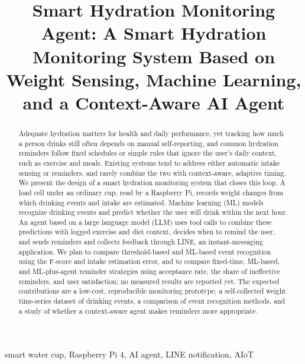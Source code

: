 \documentclass[conference]{IEEEtran}
\begin{document}
\title{Smart Hydration Monitoring Agent: A Smart Hydration Monitoring System Based on Weight Sensing, Machine Learning, and a Context-Aware AI Agent}

\author{
\and
{}
\and
{}
}

\maketitle

\begin{abstract}
Adequate hydration matters for health and daily performance, yet tracking how much a person drinks still often depends on manual self-reporting, and common hydration reminders follow fixed schedules or simple rules that ignore the user's daily context, such as exercise and meals. Existing systems tend to address either automatic intake sensing or reminders, and rarely combine the two with context-aware, adaptive timing. We present the design of a smart hydration monitoring system that closes this loop. A load cell under an ordinary cup, read by a Raspberry Pi, records weight changes from which drinking events and intake are estimated. Machine learning (ML) models recognize drinking events and predict whether the user will drink within the next hour. An agent based on a large language model (LLM) uses tool calls to combine these predictions with logged exercise and diet context, decides when to remind the user, and sends reminders and collects feedback through LINE, an instant-messaging application. We plan to compare threshold-based and ML-based event recognition using the F-score and intake estimation error, and to compare fixed-time, ML-based, and ML-plus-agent reminder strategies using acceptance rate, the share of ineffective reminders, and user satisfaction; no measured results are reported yet. The expected contributions are a low-cost, reproducible monitoring prototype, a self-collected weight time-series dataset of drinking events, a comparison of event recognition methods, and a study of whether a context-aware agent makes reminders more appropriate.
\end{abstract}

\begin{IEEEkeywords}
smart water cup, Raspberry Pi 4, AI agent, LINE notification, AIoT
\end{IEEEkeywords}
\end{document}
